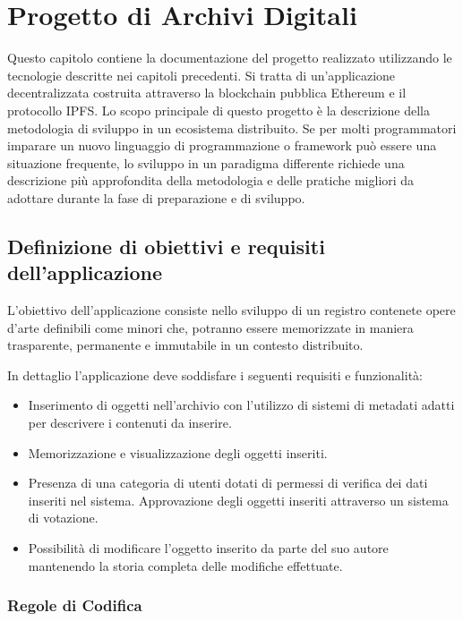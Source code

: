 \chapter{Progetto di Archivi Digitali}
\label{ch:archivi}

Questo capitolo contiene la documentazione del progetto realizzato utilizzando le tecnologie descritte nei capitoli precedenti. Si tratta di un’applicazione decentralizzata costruita attraverso la blockchain pubblica Ethereum e il protocollo IPFS. Lo scopo principale di questo progetto è la descrizione della metodologia di sviluppo in un ecosistema distribuito. Se per molti programmatori imparare un nuovo linguaggio di programmazione o framework può essere una situazione frequente, lo sviluppo in un paradigma differente richiede una descrizione più approfondita della metodologia e delle pratiche migliori da adottare durante la fase di preparazione e di sviluppo.

\section{Definizione di obiettivi e requisiti dell’applicazione}

L’obiettivo dell'applicazione consiste nello sviluppo di un registro contenete opere d’arte definibili come minori che, potranno essere memorizzate in maniera trasparente, permanente e immutabile in un contesto distribuito. 

In dettaglio l’applicazione deve soddisfare i seguenti requisiti e funzionalità:

\begin{itemize}
\item Inserimento di oggetti nell’archivio con l’utilizzo di sistemi di metadati adatti per descrivere i contenuti da inserire.
\item Memorizzazione e visualizzazione degli oggetti inseriti.
\item Presenza di una categoria di utenti dotati di permessi di verifica dei dati inseriti nel sistema. Approvazione degli oggetti inseriti attraverso un sistema di votazione.
\item Possibilità di modificare l’oggetto inserito da parte del suo autore mantenendo la storia completa delle modifiche effettuate.
\end{itemize}

\subsection{Regole di Codifica}

